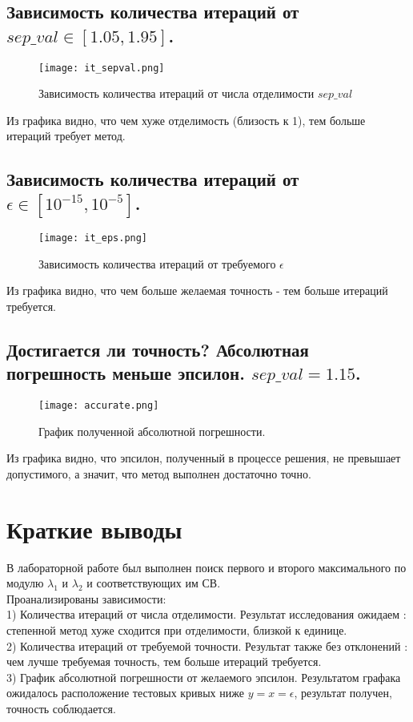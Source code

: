 \documentclass[12pt]{article}
\begin{document}
\subsection{Зависимость количества итераций от $sep\_val \in [1.05,1.95]$. }
\begin{figure}[h!]
\center
\texttt{[image: it\_sepval.png]}
\caption{Зависимость количества итераций от числа отделимости $sep\_val$}
\end{figure}
Из графика видно, что чем хуже отделимость (близость к 1), тем больше итераций требует метод.
\subsection{Зависимость количества итераций от $\epsilon \in [10^{-15},10^{-5}]$.}
\begin{figure}[h!]
\center
\texttt{[image: it\_eps.png]}
\caption{Зависимость количества итераций от требуемого $\epsilon$}
\end{figure}
Из графика видно, что чем больше желаемая точность - тем больше итераций требуется. 
\newpage
\subsection{Достигается ли точность? Абсолютная погрешность меньше эпсилон. $sep\_val = 1.15$.}
\begin{figure}[h!]
\center
\texttt{[image: accurate.png]}
\caption{График полученной абсолютной погрешности.}
\end{figure}
Из графика видно, что эпсилон, полученный в процессе решения, не превышает допустимого, а значит, что метод выполнен достаточно точно.
\section{Краткие выводы}
В лабораторной работе был выполнен поиск первого и второго максимального по модулю $\lambda_1$ и $\lambda_2$ и соответствующих им СВ. \\
Проанализированы зависимости:\\
1) Количества итераций от числа отделимости. Результат исследования ожидаем : степенной метод хуже сходится при отделимости, близкой к единице.\\
2) Количества итераций от требуемой точности. Результат также без отклонений : чем лучше требуемая точность, тем больше итераций требуется.\\
3) График абсолютной погрешности от желаемого эпсилон. Результатом графака ожидалось расположение тестовых кривых ниже $ y = x = \epsilon$, результат получен, точность соблюдается.
\end{document}
